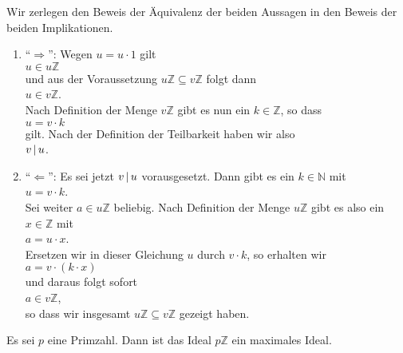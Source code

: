 \proof
Wir zerlegen den Beweis der Äquivalenz der beiden Aussagen in den Beweis der beiden Implikationen.
\begin{enumerate}
\item ``$\Rightarrow$'': Wegen $u = u \cdot 1$ gilt  
      \\[0.2cm]
      \hspace*{1.3cm}
      $u \in u\mathbb{Z}$
      \\[0.2cm]
      und aus der Voraussetzung $u\mathbb{Z} \subseteq v\mathbb{Z}$ folgt dann
      \\[0.2cm]
      \hspace*{1.3cm}
      $u \in v\mathbb{Z}$.
      \\[0.2cm]
      Nach Definition der Menge $v\mathbb{Z}$ gibt es nun ein $k \in \mathbb{Z}$, so dass
      \\[0.2cm]
      \hspace*{1.3cm}
      $u = v \cdot k$
      \\[0.2cm]
      gilt.  Nach der Definition der Teilbarkeit haben wir also
      \\[0.2cm]
      \hspace*{1.3cm}
      $v \,|\, u$.
\item ``$\Leftarrow$'':  Es sei jetzt $v \,|\, u$ vorausgesetzt.  Dann gibt es ein $k \in \mathbb{N}$
      mit 
      \\[0.2cm]
      \hspace*{1.3cm}
      $u = v \cdot k$.
      \\[0.2cm]
      Sei weiter $a \in u\mathbb{Z}$ beliebig.  Nach Definition der Menge $u\mathbb{Z}$ gibt es also
      ein $x \in \mathbb{Z}$ mit
      \\[0.2cm]
      \hspace*{1.3cm}
      $a = u \cdot x$.
      \\[0.2cm]
      Ersetzen wir in dieser Gleichung $u$ durch $v \cdot k$, so erhalten wir
      \\[0.2cm]
      \hspace*{1.3cm}
      $a = v \cdot (k \cdot x)$
      \\[0.2cm]
      und daraus folgt sofort
      \\[0.2cm]
      \hspace*{1.3cm}
      $a \in v\mathbb{Z}$,
      \\[0.2cm]
      so dass wir insgesamt $u\mathbb{Z} \subseteq v\mathbb{Z}$ gezeigt haben.
\end{enumerate}

\begin{Satz}
  Es sei $p$ eine Primzahl.  Dann ist das Ideal $p\mathbb{Z}$ ein maximales Ideal.
\end{Satz}

